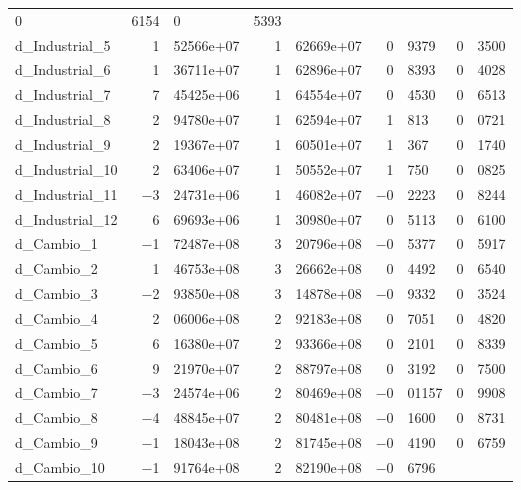 \documentclass[11pt]{article}
\begin{document}
\begin{center}
\begin{tabular}{lr@{,}lr@{,}lr@{,}lr@{,}l}
      0&6154 &
        0&5393 \\
d\_Industrial\_5 &
  1&52566\textrm{e+07} &
    1&62669\textrm{e+07} &
      0&9379 &
        0&3500 \\
d\_Industrial\_6 &
  1&36711\textrm{e+07} &
    1&62896\textrm{e+07} &
      0&8393 &
        0&4028 \\
d\_Industrial\_7 &
  7&45425\textrm{e+06} &
    1&64554\textrm{e+07} &
      0&4530 &
        0&6513 \\
d\_Industrial\_8 &
  2&94780\textrm{e+07} &
    1&62594\textrm{e+07} &
      1&813 &
        0&0721 \\
d\_Industrial\_9 &
  2&19367\textrm{e+07} &
    1&60501\textrm{e+07} &
      1&367 &
        0&1740 \\
d\_Industrial\_10 &
  2&63406\textrm{e+07} &
    1&50552\textrm{e+07} &
      1&750 &
        0&0825 \\
d\_Industrial\_11 &
  $-$3&24731\textrm{e+06} &
    1&46082\textrm{e+07} &
      $-$0&2223 &
        0&8244 \\
d\_Industrial\_12 &
  6&69693\textrm{e+06} &
    1&30980\textrm{e+07} &
      0&5113 &
        0&6100 \\
d\_Cambio\_1 &
  $-$1&72487\textrm{e+08} &
    3&20796\textrm{e+08} &
      $-$0&5377 &
        0&5917 \\
d\_Cambio\_2 &
  1&46753\textrm{e+08} &
    3&26662\textrm{e+08} &
      0&4492 &
        0&6540 \\
d\_Cambio\_3 &
  $-$2&93850\textrm{e+08} &
    3&14878\textrm{e+08} &
      $-$0&9332 &
        0&3524 \\
d\_Cambio\_4 &
  2&06006\textrm{e+08} &
    2&92183\textrm{e+08} &
      0&7051 &
        0&4820 \\
d\_Cambio\_5 &
  6&16380\textrm{e+07} &
    2&93366\textrm{e+08} &
      0&2101 &
        0&8339 \\
d\_Cambio\_6 &
  9&21970\textrm{e+07} &
    2&88797\textrm{e+08} &
      0&3192 &
        0&7500 \\
d\_Cambio\_7 &
  $-$3&24574\textrm{e+06} &
    2&80469\textrm{e+08} &
      $-$0&01157 &
        0&9908 \\
d\_Cambio\_8 &
  $-$4&48845\textrm{e+07} &
    2&80481\textrm{e+08} &
      $-$0&1600 &
        0&8731 \\
d\_Cambio\_9 &
  $-$1&18043\textrm{e+08} &
    2&81745\textrm{e+08} &
      $-$0&4190 &
        0&6759 \\
d\_Cambio\_10 &
  $-$1&91764\textrm{e+08} &
    2&82190\textrm{e+08} &
      $-$0&6796 &

\end{tabular}
\end{center}
\end{document}
